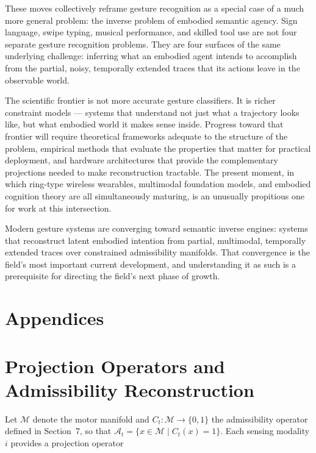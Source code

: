 \documentclass[11pt, a4paper]{article}
\theoremstyle{definition}
\begin{document}
These moves collectively reframe gesture recognition as a special case of a much more general problem: the inverse problem of embodied semantic agency. Sign language, swipe typing, musical performance, and skilled tool use are not four separate gesture recognition problems. They are four surfaces of the same underlying challenge: inferring what an embodied agent intends to accomplish from the partial, noisy, temporally extended traces that its actions leave in the observable world.

The scientific frontier is not more accurate gesture classifiers. It is richer constraint models --- systems that understand not just what a trajectory looks like, but what embodied world it makes sense inside. Progress toward that frontier will require theoretical frameworks adequate to the structure of the problem, empirical methods that evaluate the properties that matter for practical deployment, and hardware architectures that provide the complementary projections needed to make reconstruction tractable. The present moment, in which ring-type wireless wearables, multimodal foundation models, and embodied cognition theory are all simultaneously maturing, is an unusually propitious one for work at this intersection.

Modern gesture systems are converging toward semantic inverse engines: systems that reconstruct latent embodied intention from partial, multimodal, temporally extended traces over constrained admissibility manifolds. That convergence is the field's most important current development, and understanding it as such is a prerequisite for directing the field's next phase of growth.


\hspace{1cm}


\section*{Appendices}
\appendix

\section{Projection Operators and Admissibility Reconstruction}
\label{app:projection}

Let $\mathcal{M}$ denote the motor manifold and $C_t : \mathcal{M} \to \{0,1\}$ the admissibility operator defined in Section~7, so that $\mathcal{A}_t = \{x \in \mathcal{M} \mid C_t(x) = 1\}$. Each sensing modality $i$ provides a projection operator
\end{document}
